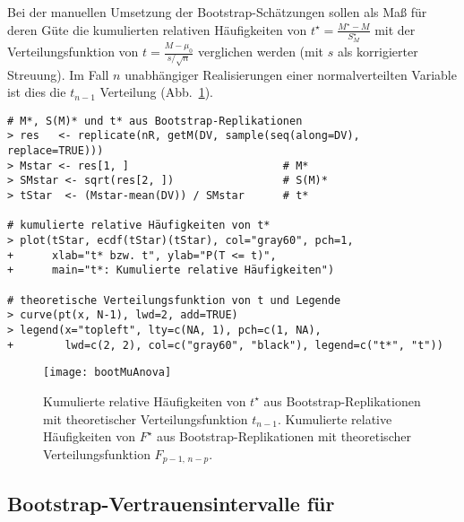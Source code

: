 Bei der manuellen Umsetzung der Bootstrap-Schätzungen sollen als Maß für deren Güte die kumulierten relativen Häufigkeiten von $t^{\star} = \frac{M^{\star}-M}{S_{M}^{\star}}$ mit der Verteilungsfunktion von $t = \frac{M - \mu_{0}}{s / \sqrt{n}}$ verglichen werden (mit $s$ als korrigierter Streuung). Im Fall $n$ unabhängiger Realisierungen einer normalverteilten Variable ist dies die $t_{n-1}$ Verteilung (Abb.\ \ref{fig:bootstrap}).
\begin{lstlisting}
# M*, S(M)* und t* aus Bootstrap-Replikationen
> res   <- replicate(nR, getM(DV, sample(seq(along=DV), replace=TRUE)))
> Mstar <- res[1, ]                        # M*
> SMstar <- sqrt(res[2, ])                 # S(M)*
> tStar  <- (Mstar-mean(DV)) / SMstar      # t*

# kumulierte relative Häufigkeiten von t*
> plot(tStar, ecdf(tStar)(tStar), col="gray60", pch=1,
+      xlab="t* bzw. t", ylab="P(T <= t)",
+      main="t*: Kumulierte relative Häufigkeiten")

# theoretische Verteilungsfunktion von t und Legende
> curve(pt(x, N-1), lwd=2, add=TRUE)
> legend(x="topleft", lty=c(NA, 1), pch=c(1, NA),
+        lwd=c(2, 2), col=c("gray60", "black"), legend=c("t*", "t"))
\end{lstlisting}

\begin{figure}[ht]
\centering
\texttt{[image: bootMuAnova]}
\vspace*{-0.5em}
\caption{Kumulierte relative Häufigkeiten von $t^{\star}$ aus Bootstrap-Replikationen mit theoretischer Verteilungsfunktion $t_{n-1}$. Kumulierte relative Häufigkeiten von $F^{\star}$ aus Bootstrap-Replikationen mit theoretischer Verteilungsfunktion $F_{p-1,\, n-p}$.}
\label{fig:bootstrap}
\end{figure}

\subsection[Bootstrap-Vertrauensintervalle für \texorpdfstring{$\mu_{2}-\mu_{1}$}{mu2-mu1}]{Bootstrap-Vertrauensintervalle für }
\label{sec:bootTwoInd}

